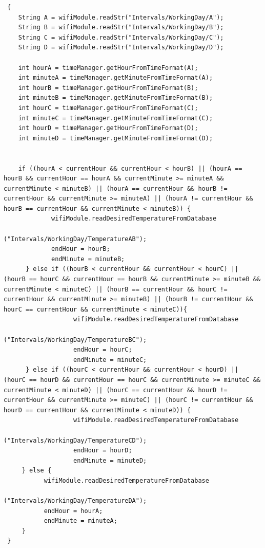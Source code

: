 \vspace{1em}
	
\begin{lstlisting}
 {
    String A = wifiModule.readStr("Intervals/WorkingDay/A");
    String B = wifiModule.readStr("Intervals/WorkingDay/B");
    String C = wifiModule.readStr("Intervals/WorkingDay/C");
    String D = wifiModule.readStr("Intervals/WorkingDay/D");

    int hourA = timeManager.getHourFromTimeFormat(A);
    int minuteA = timeManager.getMinuteFromTimeFormat(A);
    int hourB = timeManager.getHourFromTimeFormat(B);
    int minuteB = timeManager.getMinuteFromTimeFormat(B);
    int hourC = timeManager.getHourFromTimeFormat(C);
    int minuteC = timeManager.getMinuteFromTimeFormat(C);
    int hourD = timeManager.getHourFromTimeFormat(D);
    int minuteD = timeManager.getMinuteFromTimeFormat(D);


    if ((hourA < currentHour && currentHour < hourB) || (hourA == hourB && currentHour == hourA && currentMinute >= minuteA && currentMinute < minuteB) || (hourA == currentHour && hourB != currentHour && currentMinute >= minuteA) || (hourA != currentHour && hourB == currentHour && currentMinute < minuteB)) {
             wifiModule.readDesiredTemperatureFromDatabase
									("Intervals/WorkingDay/TemperatureAB");
             endHour = hourB;
             endMinute = minuteB;
      } else if ((hourB < currentHour && currentHour < hourC) || (hourB == hourC && currentHour == hourB && currentMinute >= minuteB && currentMinute < minuteC) || (hourB == currentHour && hourC != currentHour && currentMinute >= minuteB) || (hourB != currentHour && hourC == currentHour && currentMinute < minuteC)){
                   wifiModule.readDesiredTemperatureFromDatabase
									("Intervals/WorkingDay/TemperatureBC");
                   endHour = hourC;
                   endMinute = minuteC;
      } else if ((hourC < currentHour && currentHour < hourD) ||  (hourC == hourD && currentHour == hourC && currentMinute >= minuteC && currentMinute < minuteD) || (hourC == currentHour && hourD != currentHour && currentMinute >= minuteC) || (hourC != currentHour && hourD == currentHour && currentMinute < minuteD)) {
                   wifiModule.readDesiredTemperatureFromDatabase
									("Intervals/WorkingDay/TemperatureCD");
                   endHour = hourD;
                   endMinute = minuteD;
     } else {
           wifiModule.readDesiredTemperatureFromDatabase
									("Intervals/WorkingDay/TemperatureDA");
           endHour = hourA;
           endMinute = minuteA;
     }
 }
\end{lstlisting}
\vspace{2em}

